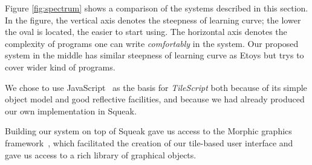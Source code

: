 

  Figure \ref{fig:spectrum} shows a comparison of the systems described in this section.
In the figure, the vertical axis
denotes the steepness of learning curve; the lower the oval is located,
the easier to start using.  The horizontal axis denotes the complexity
of programs one can write {\em comfortably} in the system.  Our proposed 
system in the middle has similar steepness of learning curve as
Etoys but trys to cover wider kind of programs.


  We chose to use JavaScript~\cite{ecma99javascript} as the basis for {\em TileScript} both because
of its simple object model and good reflective facilities, and because we had already produced our own
implementation in Squeak.

  Building our system on top of Squeak gave us access to the Morphic graphics
framework~\cite{jm02MorphicNuBlue}, which facilitated the creation of our tile-based
user interface and gave us access to a rich library of graphical objects.

